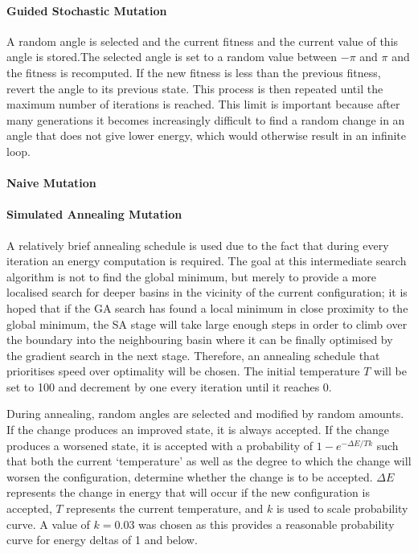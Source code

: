 \documentclass{article}
\begin{document}
\paragraph{Guided Stochastic Mutation}


A random angle is selected and the current fitness and the current value of this
	angle is stored.The selected angle is set to a random value between $-\pi$
	and $\pi$ and the fitness is recomputed. If the new fitness is less than the
	previous fitness, revert the angle to its previous state. This process is
	then repeated until the maximum number of iterations is reached. This limit
	is important because after many generations it becomes increasingly
	difficult to find a random change in an angle that does not give lower
	energy, which would otherwise result in an infinite loop.

\paragraph{Naive Mutation}

\paragraph{Simulated Annealing Mutation}

A relatively brief annealing schedule is used due to the fact that during every
iteration an energy computation is required. The goal at this intermediate
search algorithm is not to find the global minimum, but merely to provide a more
localised search for deeper basins in the vicinity of the current configuration;
it is hoped that if the GA search has found a local minimum in close proximity
to the global minimum, the SA stage will take large enough steps in order to
climb over the boundary into the neighbouring basin where it can be finally
optimised by the gradient search in the next stage. Therefore, an annealing
schedule that prioritises speed over optimality will be chosen. The initial
temperature $T$ will be set to 100 and decrement by one every iteration until it
reaches 0.

During annealing, random angles are selected and modified by random amounts. If
the change produces an improved state, it is always accepted. If the change
produces a worsened state, it is accepted with a probability of $1 - e^{-\Delta
E / Tk}$ such that both the current `temperature' as well as the degree to which
the change will worsen the configuration, determine whether the change is to be
accepted. $\Delta E$ represents the change in energy that will occur if the new
configuration is accepted, $T$ represents the current temperature, and $k$ is
used to scale probability curve. A value of $k=0.03$ was chosen as this provides
a reasonable probability curve for energy deltas of 1 and below.
\end{document}
